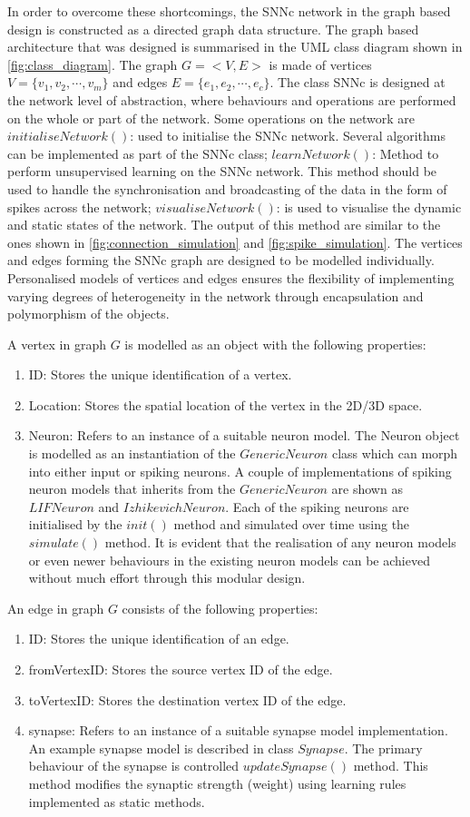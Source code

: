In order to overcome these shortcomings, the SNNc network in the graph based design is constructed as a directed graph data structure. The graph based architecture that was designed is summarised in the UML class diagram shown in \figurename \ref{fig:class_diagram}. The graph $G=<V, E>$ is made of vertices $V=\{v_1,v_2, \cdots, v_m\}$ and edges $E=\{e_1, e_2,\cdots, e_c\}$. The class SNNc is designed at the network level of abstraction, where behaviours and operations are performed on the whole or part of the network. Some operations on the network are $initialiseNetwork()$: used to initialise the SNNc network. Several algorithms can be implemented as part of the SNNc class; $learnNetwork()$: Method to perform unsupervised learning on the SNNc network. This method should be used to handle the synchronisation and broadcasting of the data in the form of spikes across the network; $visualiseNetwork()$: is used to visualise the dynamic and static states of the network. The output of this method are similar to the ones shown in \figurenames \ref{fig:connection_simulation} and \ref{fig:spike_simulation}. The vertices and edges forming the SNNc graph are designed to be modelled individually. Personalised models of vertices and edges ensures the flexibility of implementing varying degrees of heterogeneity in the network through encapsulation and polymorphism of the objects.  

A vertex in graph $G$ is modelled as an object with the following properties:
\begin{enumerate}
	\item ID: Stores the unique identification of a vertex.
	\item Location: Stores the spatial location of the vertex in the 2D/3D space.
	\item Neuron: Refers to an instance of a suitable neuron model. The Neuron object is modelled as an instantiation of the $GenericNeuron$ class which can morph into either input or spiking neurons. A couple of implementations of spiking neuron models that inherits from the $GenericNeuron$ are shown as $LIFNeuron$ and $IzhikevichNeuron$. Each of the spiking neurons are initialised by the $init()$ method and simulated over time using the $simulate()$ method.  It is evident that the realisation of any neuron models or even newer behaviours in the existing neuron models can be achieved without much effort through this modular design. 
\end{enumerate}
An edge in graph $G$ consists of the following properties:
\begin{enumerate}
	\item ID: Stores the unique identification of an edge.
	\item fromVertexID: Stores the source vertex ID of the edge.
	\item toVertexID: Stores the destination vertex ID of the edge.
	\item synapse: Refers to an instance of a suitable synapse model implementation. An example synapse model is described in class $Synapse$. The primary behaviour of the synapse is controlled $updateSynapse()$ method. This method modifies the synaptic strength (weight) using learning rules implemented as static methods.  
\end{enumerate}


